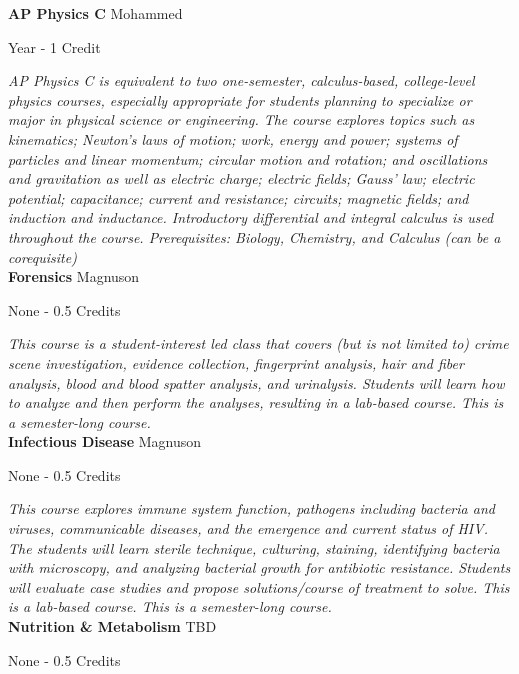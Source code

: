 \noindent\textbf{AP Physics C} \hfill Mohammed

\noindent Year - 1 Credit

\vspace{1mm}\emph{AP Physics C is equivalent to two one-semester, calculus-based, college-level
physics courses, especially appropriate for students planning to specialize or major in physical science or
engineering. The course explores topics such as kinematics; Newton’s laws of motion; work, energy and
power; systems of particles and linear momentum; circular motion and rotation; and oscillations and
gravitation as well as electric charge; electric fields; Gauss’ law; electric potential; capacitance; current
and resistance; circuits; magnetic fields; and induction and inductance. Introductory differential and
integral calculus is used throughout the course. Prerequisites: Biology, Chemistry, and Calculus (can be a corequisite)}\\


\noindent\textbf{Forensics} \hfill Magnuson

\noindent None - 0.5 Credits

\vspace{1mm}\emph{This course is a student-interest led class that covers (but is not limited to) crime scene investigation, evidence collection, fingerprint analysis, hair and fiber analysis, blood and blood spatter analysis, and urinalysis. Students will learn how to analyze and then perform the analyses, resulting in a lab-based course. This is a semester-long course.}\\


\noindent\textbf{Infectious Disease} \hfill Magnuson

\noindent None - 0.5 Credits

\vspace{1mm}\emph{This course explores immune system function, pathogens including bacteria and viruses, communicable diseases, and the emergence and current status of HIV. The students will learn sterile technique, culturing, staining, identifying bacteria with microscopy, and analyzing bacterial growth for antibiotic resistance. Students will evaluate case studies and propose solutions/course of treatment to solve. This is a lab-based course. This is a semester-long course.}\\


\noindent\textbf{Nutrition \& Metabolism} \hfill TBD

\noindent None - 0.5 Credits

